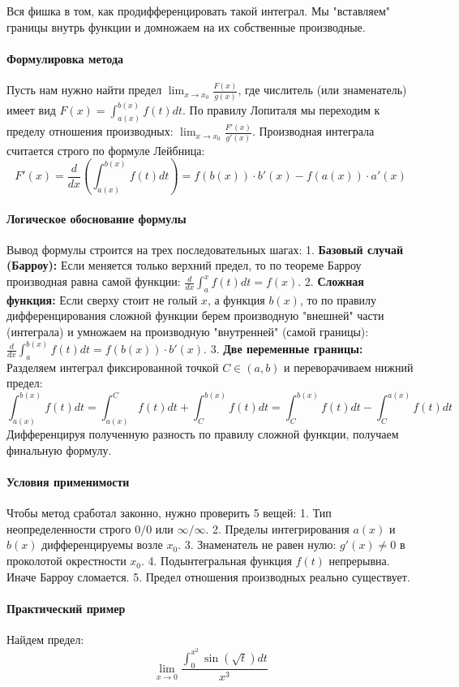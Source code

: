 Вся фишка в том, как продифференцировать такой интеграл. Мы "вставляем" границы внутрь функции и домножаем на их собственные производные.

\paragraph{Формулировка метода}
Пусть нам нужно найти предел $\lim_{x \to x_0} \frac{F(x)}{g(x)}$, где числитель (или знаменатель) имеет вид $F(x) = \int_{a(x)}^{b(x)} f(t)dt$.
По правилу Лопиталя мы переходим к пределу отношения производных: $\lim_{x \to x_0} \frac{F'(x)}{g'(x)}$.
Производная интеграла считается строго по формуле Лейбница:
$$ F'(x) = \frac{d}{dx} \left( \int_{a(x)}^{b(x)} f(t)dt \right) = f(b(x)) \cdot b'(x) - f(a(x)) \cdot a'(x) $$

\paragraph{Логическое обоснование формулы}
Вывод формулы строится на трех последовательных шагах:
1. \textbf{Базовый случай (Барроу):} Если меняется только верхний предел, то по теореме Барроу производная равна самой функции: $\frac{d}{dx} \int_a^x f(t)dt = f(x)$.
2. \textbf{Сложная функция:} Если сверху стоит не голый $x$, а функция $b(x)$, то по правилу дифференцирования сложной функции берем производную "внешней" части (интеграла) и умножаем на производную "внутренней" (самой границы): $\frac{d}{dx} \int_a^{b(x)} f(t)dt = f(b(x)) \cdot b'(x)$.
3. \textbf{Две переменные границы:} Разделяем интеграл фиксированной точкой $C \in (a, b)$ и переворачиваем нижний предел:
$$ \int_{a(x)}^{b(x)} f(t)dt = \int_{a(x)}^C f(t)dt + \int_C^{b(x)} f(t)dt = \int_C^{b(x)} f(t)dt - \int_C^{a(x)} f(t)dt $$
Дифференцируя полученную разность по правилу сложной функции, получаем финальную формулу.

\paragraph{Условия применимости}
Чтобы метод сработал законно, нужно проверить 5 вещей:
1. Тип неопределенности строго $0/0$ или $\infty/\infty$.
2. Пределы интегрирования $a(x)$ и $b(x)$ дифференцируемы возле $x_0$.
3. Знаменатель не равен нулю: $g'(x) \neq 0$ в проколотой окрестности $x_0$.
4. Подынтегральная функция $f(t)$ непрерывна. Иначе Барроу сломается.
5. Предел отношения производных реально существует.

\paragraph{Практический пример}
Найдем предел:
$$ \lim_{x \to 0} \frac{\int_0^{x^2} \sin(\sqrt{t}) dt}{x^3} $$

